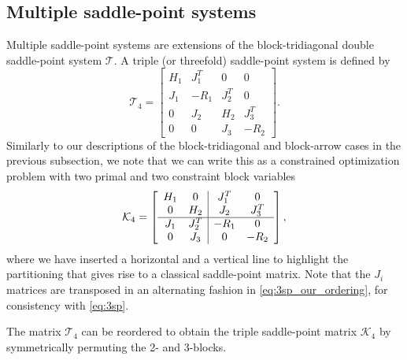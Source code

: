 \documentclass{article}
\newcommand{\sK}{\mathcal{K}}
\newcommand{\sT}{\mathcal{T}}
\begin{document}
\subsection{Multiple saddle-point systems}
\label{sec:multiple}
Multiple saddle-point systems are extensions of the block-tridiagonal double saddle-point system $\sT$. A triple (or threefold) saddle-point system is defined by
\begin{equation}
\label{eq:3sp}
\sT_4 = \begin{bmatrix}
H_1 &  J_1^T &  0 & 0  \\
J_1 & -R_1 & J_2^T & 0 \\
0 & J_2 & H_2 & J_3^T \\
 0 & 0 &  J_3 & -R_2
\end{bmatrix}.
\end{equation}
Similarly to our descriptions of the block-tridiagonal and block-arrow cases in the previous subsection, we note that we can write this as a constrained optimization problem with two primal and two constraint block variables
\begin{equation}
\label{eq:3sp_our_ordering}
\sK_4 = \left[\begin{array}{c c | c c}
H_1 & 0 & J_1^T & 0  \\
0 & H_2 & J_2 & J_3^T \\
\hline
J_1 & J_2^T & -R_1 & 0 \\
0& J_3 & 0 & -R_2
\end{array}\right], 
\end{equation}
where we have inserted a horizontal and a vertical line to highlight the partitioning that gives rise to a classical saddle-point matrix. Note that the $J_i$ matrices are  transposed in an alternating fashion in \eqref{eq:3sp_our_ordering}, for consistency with \eqref{eq:3sp}.


The matrix $\sT_4$ can be reordered to obtain the triple saddle-point matrix $\sK_4$ by symmetrically permuting the 2- and 3-blocks.
\end{document}
